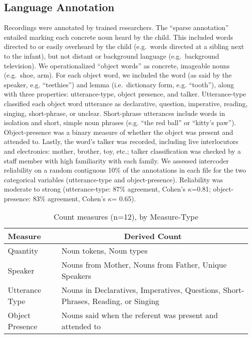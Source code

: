 \documentclass[floatsintext,man]{apa6}
\theoremstyle{definition}
\theoremstyle{definition}
\theoremstyle{definition}
\theoremstyle{remark}
\begin{document}
\hypertarget{language-annotation}{%
\subsection{Language Annotation}\label{language-annotation}}

Recordings were annotated by trained researchers. The \enquote{sparse
annotation} entailed marking each concrete noun heard by the child. This
included words directed to or easily overheard by the child (e.g.~words
directed at a sibling next to the infant), but not distant or background
language (e.g.~background television). We operationalized
\enquote{object words} as concrete, imageable nouns (e.g.~shoe, arm).
For each object word, we included the word (as said by the speaker, e.g.
\enquote{teethies}) and lemma (i.e.~dictionary form, e.g.
\enquote{tooth}), along with three properties: utterance-type, object
presence, and talker. Utterance-type classified each object word
utterance as declarative, question, imperative, reading, singing,
short-phrase, or unclear. Short-phrase utterances include words in
isolation and short, simple noun phrases (e.g. \enquote{the red ball} or
\enquote{kitty's paw}). Object-presence was a binary measure of whether
the object was present and attended to. Lastly, the word's talker was
recorded, including live interlocutors and electronics: mother, brother,
toy, etc.; talker classification was checked by a staff member with high
familiarity with each family. We assessed intercoder reliability on a
random contiguous 10\% of the annotations in each file for the two
categorical variables (utterance-type and object-presence). Reliability
was moderate to strong (utterance-type: 87\% agreement, Cohen's
\(\kappa\)=0.81; object-presence: 83\% agreement, Cohen's \(\kappa\)=
0.65).

\begin{table}[tbp]
\begin{center}
\begin{threeparttable}
\caption{\label{tab:measures-tab}Count measures (n=12), by Measure-Type}
\small{
\begin{tabular}{ll}
\toprule
Measure & \multicolumn{1}{c}{Derived Count}\\
\midrule
Quantity & Noun tokens, Noun types\\
Speaker & Nouns from Mother, Nouns from Father, Unique Speakers\\
Utterance Type & Nouns in Declaratives, Imperatives, Questions, Short-Phrases, Reading, or Singing\\
Object Presence & Nouns said when the referent was present and attended to\\
\bottomrule
\end{tabular}
}
\end{threeparttable}
\end{center}
\end{table}
\end{document}
